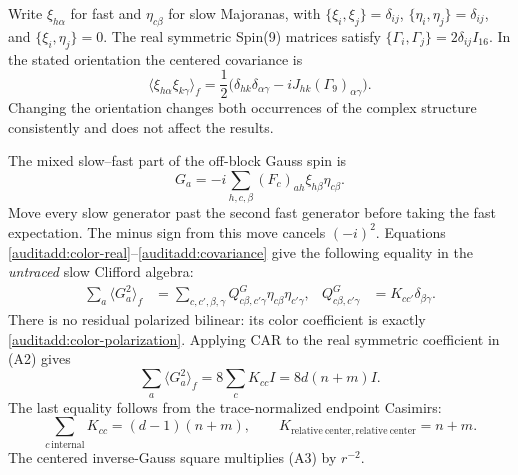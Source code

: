 Write $\xi_{h\alpha}$ for fast and $\eta_{c\beta}$ for slow Majoranas,
with $\{\xi_i,\xi_j\}=\delta_{ij}$,
$\{\eta_i,\eta_j\}=\delta_{ij}$, and $\{\xi_i,\eta_j\}=0$.
The real symmetric Spin(9) matrices satisfy
$\{\Gamma_i,\Gamma_j\}=2\delta_{ij}I_{16}$.
In the stated orientation the centered covariance is
\[
 \langle\xi_{h\alpha}\xi_{k\gamma}\rangle_f
 =\frac12\bigl(\delta_{hk}\delta_{\alpha\gamma}
              -iJ_{hk}(\Gamma_9)_{\alpha\gamma}\bigr).
 \tag{A1}\label{auditadd:covariance}
\]
Changing the orientation changes both occurrences of the complex
structure consistently and does not affect the results.

The mixed slow--fast part of the off-block Gauss spin is
\[
 G_a=-i\sum_{h,c,\beta}(F_c)_{ah}\xi_{h\beta}\eta_{c\beta}.
\]
Move every slow generator past the second fast generator before taking
the fast expectation. The minus sign from this move cancels
$(-i)^2$. Equations \eqref{auditadd:color-real}--\eqref{auditadd:covariance}
give the following equality in the \emph{untraced} slow Clifford algebra:
\begin{align}
 \sum_a\langle G_a^2\rangle_f
 &=\sum_{c,c',\beta,\gamma}
       Q^G_{c\beta,c'\gamma}\eta_{c\beta}\eta_{c'\gamma},
 &Q^G_{c\beta,c'\gamma}&=K_{cc'}\delta_{\beta\gamma}.
 \tag{A2}\label{auditadd:gauss-coefficient}
\end{align}
There is no residual polarized bilinear: its color coefficient is
exactly \eqref{auditadd:color-polarization}. Applying CAR to the real
symmetric coefficient in (A2) gives
\[
 \sum_a\langle G_a^2\rangle_f
 =8\sum_cK_{cc}I=8d(n+m)I.
 \tag{A3}\label{auditadd:gauss-scalar}
\]
The last equality follows from the trace-normalized endpoint Casimirs:
\[
 \sum_{c\,\mathrm{internal}}K_{cc}=(d-1)(n+m),\qquad
 K_{\mathrm{relative\ center},\mathrm{relative\ center}}=n+m.
\]
The centered inverse-Gauss square multiplies (A3) by $r^{-2}$.

